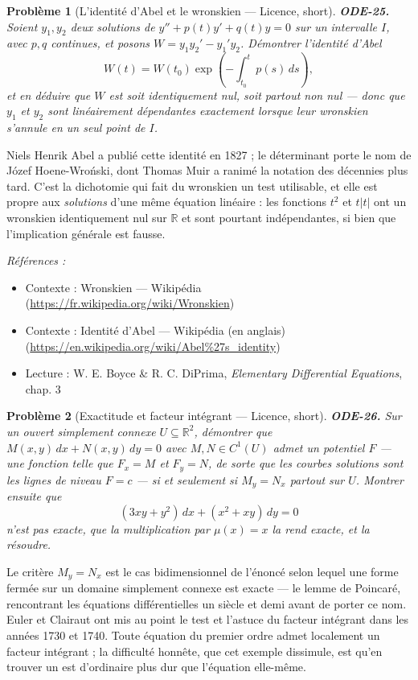 \documentclass[11pt]{article}
\newtheorem{problem}{Problème}
\newenvironment{refs}{\par\small\noindent\emph{Références :}\begin{itemize}\setlength\itemsep{0pt}}{\end{itemize}\normalsize}
\begin{document}
\begin{problem}[{L'identité d'Abel et le wronskien --- Licence, short}]
\textbf{ODE-25.} Soient $ y_1, y_2 $ deux solutions de
$ y'' + p(t)y' + q(t)y = 0 $ sur un intervalle $ I $, avec $ p, q $ continues, et posons
$ W = y_1 y_2' - y_1' y_2 $. Démontrer l'identité d'Abel
\[ W(t) = W(t_0)\exp\!\left( -\int_{t_0}^{t} p(s)\,ds \right), \]
et en déduire que $ W $ est soit identiquement nul, soit partout non nul --- donc que $ y_1 $ et
$ y_2 $ sont linéairement dépendantes exactement lorsque leur wronskien s'annule en un seul
point de $ I $.
\end{problem}

\noindent Niels Henrik Abel a publié cette identité en 1827 ; le déterminant porte le nom
de Józef Hoene-Wro\'nski, dont Thomas Muir a ranimé la notation des décennies plus tard. C'est la
dichotomie qui fait du wronskien un test utilisable, et elle est propre aux \textit{solutions} d'une
même équation linéaire : les fonctions $ t^2 $ et $ t|t| $ ont un wronskien identiquement nul
sur $\mathbb{R}$ et sont pourtant indépendantes, si bien que l'implication générale est fausse.

\begin{refs}
\item Contexte : Wronskien --- Wikipédia (\url{https://fr.wikipedia.org/wiki/Wronskien})
\item Contexte : Identité d'Abel --- Wikipédia (en anglais) (\url{https://en.wikipedia.org/wiki/Abel%27s_identity})
\item Lecture : W. E. Boyce \& R. C. DiPrima, \textit{Elementary Differential Equations}, chap. 3
\end{refs}

\bigskip

\begin{problem}[{Exactitude et facteur intégrant --- Licence, short}]
\textbf{ODE-26.} Sur un ouvert simplement connexe
$ U \subseteq \mathbb{R}^2 $, démontrer que $ M(x,y)\,dx + N(x,y)\,dy = 0 $ avec
$ M, N \in C^1(U) $ admet un potentiel $ F $ --- une fonction telle que $ F_x = M $ et
$ F_y = N $, de sorte que les courbes solutions sont les lignes de niveau $ F = c $ --- si et
seulement si $ M_y = N_x $ partout sur $ U $. Montrer ensuite que
\[ (3xy + y^2)\,dx + (x^2 + xy)\,dy = 0 \]
n'est pas exacte, que la multiplication par $ \mu(x) = x $ la rend exacte, et la résoudre.
\end{problem}

\noindent Le critère $ M_y = N_x $ est le cas bidimensionnel de l'énoncé selon lequel
une forme fermée sur un domaine simplement connexe est exacte --- le lemme de Poincaré, rencontrant
les équations différentielles un siècle et demi avant de porter ce nom. Euler et Clairaut ont mis
au point le test et l'astuce du facteur intégrant dans les années 1730 et 1740. Toute équation du
premier ordre admet localement un facteur intégrant ; la difficulté honnête, que cet exemple
dissimule, est qu'en trouver un est d'ordinaire plus dur que l'équation elle-même.
\end{document}
